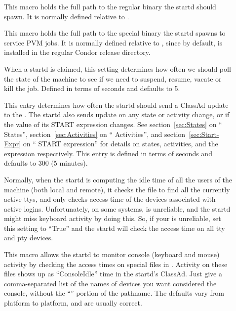 \begin{description}

\item[] \label{param:Starter}  This macro holds the full
  path to the regular  binary the startd should
  spawn.  It is normally defined relative to .
  
\item[] \label{param:AlternateStarter1}
  This macro holds the full path to the special 
  binary the startd spawns to service PVM jobs.  It is normally
  defined relative to , since by default,
   is installed in the regular Condor release
  directory. 
  
\item[] \label{param:PollingInterval} When a
  startd is claimed, this setting determines how often we should poll
  the state of the machine to see if we need to suspend, resume,
  vacate or kill the job.  Defined in terms of seconds and defaults to
  5.
  
\item[] \label{param:UpdateInterval} This
  entry determines how often the startd should send a ClassAd update
  to the .  The startd also sends update on any
  state or activity change, or if the value of its START expression
  changes.  See section~\ref{sec:States} on ``
  States'', section~\ref{sec:Activities} on ``
  Activities'', and section~\ref{sec:Start-Expr} on ``
  START expression'' for details on states, activities, and the
   expression respectively.  This entry is defined in
  terms of seconds and defaults to 300 (5 minutes).
  
\item[] \label{param:StartdHasBadUtmp}
  Normally, when the startd is computing the idle time of all the
  users of the machine (both local and remote), it checks the
   file to find all the currently active ttys, and only
  checks access time of the devices associated with active logins.
  Unfortunately, on some systems,  is unreliable, and the
  startd might miss keyboard activity by doing this.  So, if your
   is unreliable, set this setting to ``True'' and the
  startd will check the access time on all tty and pty devices.
  
\item[] \label{param:ConsoleDevices} This
  macro allows the startd to monitor console (keyboard and mouse)
  activity by checking the access times on special files in
  .  Activity on these files shows up as ``ConsoleIdle''
  time in the startd's ClassAd.  Just give a comma-separated list of
  the names of devices you want considered the console, without the
  ``'' portion of the pathname.  The defaults vary from
  platform to platform, and are usually correct.  


\end{description}
